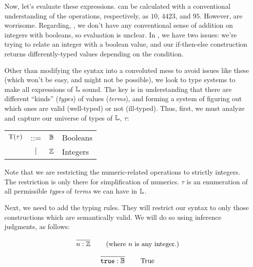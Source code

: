 
Now, let's evaluate these expressions.
 can be calculated with a
conventional understanding of the operations, respectively, as \(10\), \(4423\),
and \(95\). However,  are worrisome. Regarding,
, we don't have any conventional sense of addition on
integers with booleans, so evaluation is unclear. In , we
have two issues: we're trying to relate an integer with a boolean value, and our
if-then-else construction returns differently-typed values depending on the
condition.


Other than modifying the syntax into a convoluted mess to avoid issues like
these (which won't be easy, and might not be possible), we look to type systems
to make all expressions of \(\mathbb{L}\) sound. The key is in understanding that
there are different ``kinds'' (\textit{types}) of values (\textit{terms}), and
forming a system of figuring out which ones are valid (well-typed) or not
(ill-typed). Thus, first, we must analyze and capture our universe of types of
\(\mathbb{L}\), \(\tau\):

\begin{longtable}{ r c c l}
      \(\mathrm{T}(\tau)\) & ::=       & \(\mathbb{B}\) & Booleans \\
                     & \(\vert\) & \(\mathbb{Z}\) & Integers
\end{longtable}

Note that we are restricting the numeric-related operations to strictly
integers. The restriction is only there for simplification of numerics. \(\tau\)
is an enumeration of all permissible \textit{types} of \textit{terms} we can
have in \(\mathbb{L}\).

Next, we need to add the typing rules. They will restrict our syntax to only
those constructions which are semantically valid. We will do so using inference
judgments, as follows:

\begin{equation}
      \left.
      \infer{n : \bb{Z}}{}
      \right.
      \qquad
      \text{(where \(n\) is any integer.)}
      \label{eq:exTR:int}
\end{equation}

\begin{equation}
      \left.
      \infer{\texttt{true} : \bb{B}}{}
      \right.
      \qquad
      \text{True}
      \label{eq:exTR:true}
\end{equation}


